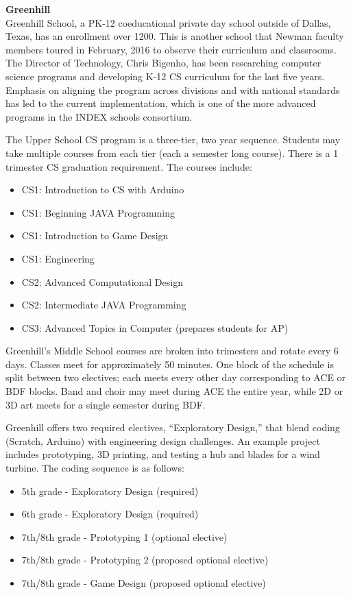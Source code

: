 \textbf{Greenhill} \\
Greenhill School, a PK-12 coeducational private day school outside of Dallas, Texas, has an enrollment over 1200. This is another school that Newman faculty members toured in February, 2016 to observe their curriculum and classrooms. The Director of Technology, Chris Bigenho, has been researching computer science programs and developing K-12 CS curriculum for the last five years. Emphasis on aligning the program across divisions and with national standards has led to the current implementation, which is one of the more advanced programs in the INDEX schools consortium. \par 
The Upper School CS program is a three-tier, two year sequence. Students may take multiple courses from each tier (each a semester long course). There is a 1 trimester CS graduation requirement. The courses include:
\begin{itemize} 
	\item CS1: Introduction to CS with Arduino
	\item CS1: Beginning JAVA Programming 
	\item CS1: Introduction to Game Design 
	\item CS1: Engineering
	\item CS2: Advanced Computational Design
	\item CS2: Intermediate JAVA Programming
	\item CS3: Advanced Topics in Computer (prepares students for AP)
\end{itemize}
Greenhill’s Middle School courses are broken into trimesters and rotate every 6 days. Classes meet for approximately 50 minutes. One block of the schedule is split between two electives; each meets every other day corresponding to ACE or BDF blocks. Band and choir may meet during ACE the entire year, while 2D or 3D art meets for a single semester during BDF. \par
Greenhill offers two required electives, ``Exploratory Design,'' that blend coding (Scratch, Arduino) with engineering design challenges. An example project includes prototyping, 3D printing, and testing a hub and blades for a wind turbine. The coding sequence is as follows:
\begin{itemize}
	\item 5th grade - Exploratory Design (required)
	\item 6th grade - Exploratory Design (required)
	\item 7th/8th grade - Prototyping 1 (optional elective)
	\item 7th/8th grade - Prototyping 2 (proposed optional elective)
	\item 7th/8th grade - Game Design (proposed optional elective)
\end{itemize}
